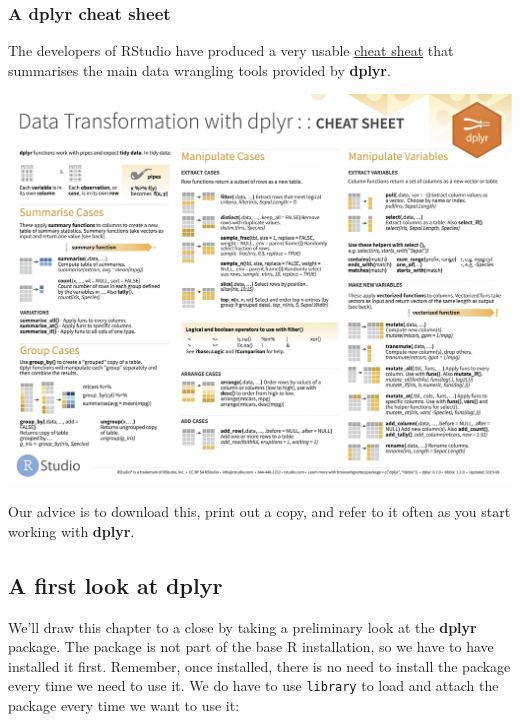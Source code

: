 \documentclass[
]{book}
\newenvironment{greybox}{
  \definecolor{shadecolor}{rgb}{0.95,0.95,0.95}  %
  \color{black}
  \begin{shaded}}
 {\end{shaded}}
\newenvironment{infobox}[1]
  {
  \begin{itemize}
  \renewcommand{\labelitemi}{
    \raisebox{-.7\height}[0pt][0pt]{
      {\setkeys{Gin}{width=3em,keepaspectratio}
        \texttt{[image: images/\#1]}}
    }
  }
  \setlength{\fboxsep}{1em}
  \begin{greybox}
  \item
  }
  {
  \end{greybox}
  \end{itemize}
  }
\begin{document}
\begin{infobox}{information}

\hypertarget{a-dplyr-cheat-sheet}{%
\subsubsection*{\texorpdfstring{A \textbf{dplyr} cheat sheet}{A dplyr cheat sheet}}\label{a-dplyr-cheat-sheet}}

The developers of RStudio have produced a very usable \href{http://www.rstudio.com/resources/cheatsheets/}{cheat sheat} that summarises the main data wrangling tools provided by \textbf{dplyr}.

\includegraphics{images/data-transformation.jpg}

Our advice is to download this, print out a copy, and refer to it often as you start working with \textbf{dplyr}.

\end{infobox}

\hypertarget{more-dplyr}{%
\subsection{\texorpdfstring{A first look at \textbf{dplyr}}{A first look at dplyr}}\label{more-dplyr}}

We'll draw this chapter to a close by taking a preliminary look at the \textbf{dplyr} package. The package is not part of the base R installation, so we have to have installed it first. Remember, once installed, there is no need to install the package every time we need to use it. We do have to use \texttt{library} to load and attach the package every time we want to use it:
\end{document}
